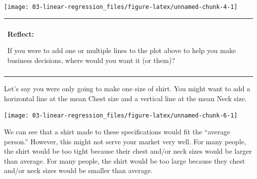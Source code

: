 \documentclass[
]{book}
\newenvironment{Shaded}{\begin{snugshade}}{\end{snugshade}}
\newcommand{\AttributeTok}[1]{\textcolor[rgb]{0.13,0.29,0.53}{#1}}
\newcommand{\FunctionTok}[1]{\textcolor[rgb]{0.13,0.29,0.53}{\textbf{#1}}}
\newcommand{\NormalTok}[1]{#1}
\newcommand{\SpecialCharTok}[1]{\textcolor[rgb]{0.81,0.36,0.00}{\textbf{#1}}}
\newcommand{\StringTok}[1]{\textcolor[rgb]{0.31,0.60,0.02}{#1}}
\newenvironment{reflect}
{
    \begin{center}
    
    \begin{tabular}{|p{0.8\textwidth}|}
    \rowcolor{LightBlue}
    \hline\\
    \rowcolor{LightBlue}
    \textbf{Reflect:}
}
{
    \\\rowcolor{LightBlue}
    \\\hline
    \end{tabular} 
    \end{center}
}
\begin{document}
\begin{center}\texttt{[image: 03-linear-regression\_files/figure-latex/unnamed-chunk-4-1]} \end{center}

\begin{reflect}
If you were to add one or multiple lines to the plot above to help you
make business decisions, where would you want it (or them)?
\end{reflect}

Let's say you were only going to make one size of shirt. You might want to add a horizontal line at the mean Chest size and a vertical line at the mean Neck size.

\begin{Shaded}
\end{Shaded}

\begin{center}\texttt{[image: 03-linear-regression\_files/figure-latex/unnamed-chunk-6-1]} \end{center}

We can see that a shirt made to these specifications would fit the ``average person.'' However, this might not serve your market very well. For many people, the shirt would be too tight because their chest and/or neck sizes would be larger than average. For many people, the shirt would be too large because they chest and/or neck sizes would be smaller than average.
\end{document}

